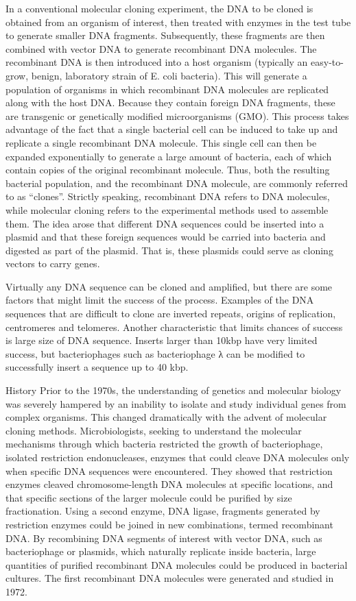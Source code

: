 In a conventional molecular cloning experiment, the DNA to be cloned is obtained from an organism of interest, then treated with enzymes in the test tube to generate smaller DNA fragments. Subsequently, these fragments are then combined with vector DNA to generate recombinant DNA molecules. The recombinant DNA is then introduced into a host organism (typically an easy-to-grow, benign, laboratory strain of E. coli bacteria). This will generate a population of organisms in which recombinant DNA molecules are replicated along with the host DNA. Because they contain foreign DNA fragments, these are transgenic or genetically modified microorganisms (GMO). This process takes advantage of the fact that a single bacterial cell can be induced to take up and replicate a single recombinant DNA molecule. This single cell can then be expanded exponentially to generate a large amount of bacteria, each of which contain copies of the original recombinant molecule. Thus, both the resulting bacterial population, and the recombinant DNA molecule, are commonly referred to as ``clones''. Strictly speaking, recombinant DNA refers to DNA molecules, while molecular cloning refers to the experimental methods used to assemble them. The idea arose that different DNA sequences could be inserted into a plasmid and that these foreign sequences would be carried into bacteria and digested as part of the plasmid. That is, these plasmids could serve as cloning vectors to carry genes.

Virtually any DNA sequence can be cloned and amplified, but there are some factors that might limit the success of the process. Examples of the DNA sequences that are difficult to clone are inverted repeats, origins of replication, centromeres and telomeres. Another characteristic that limits chances of success is large size of DNA sequence. Inserts larger than 10kbp have very limited success, but bacteriophages such as bacteriophage λ can be modified to successfully insert a sequence up to 40 kbp.

History
Prior to the 1970s, the understanding of genetics and molecular biology was severely hampered by an inability to isolate and study individual genes from complex organisms. This changed dramatically with the advent of molecular cloning methods. Microbiologists, seeking to understand the molecular mechanisms through which bacteria restricted the growth of bacteriophage, isolated restriction endonucleases, enzymes that could cleave DNA molecules only when specific DNA sequences were encountered. They showed that restriction enzymes cleaved chromosome-length DNA molecules at specific locations, and that specific sections of the larger molecule could be purified by size fractionation. Using a second enzyme, DNA ligase, fragments generated by restriction enzymes could be joined in new combinations, termed recombinant DNA. By recombining DNA segments of interest with vector DNA, such as bacteriophage or plasmids, which naturally replicate inside bacteria, large quantities of purified recombinant DNA molecules could be produced in bacterial cultures. The first recombinant DNA molecules were generated and studied in 1972.

